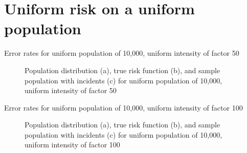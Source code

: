 

\section{Uniform risk on a uniform population}

\graphicspath{{./results/unif_50_unif/}}
\makeatletter
{}
\makeatother

\begin{table}[H]
    
    \caption[]{Error rates for uniform population of 10,000, uniform intensity of factor 50}
    \label{tbl:mean_error_rates:unif_50_unif}
\end{table}

\begin{figure}[H]
    
    \caption[]{Population distribution (a), true risk function (b), and sample population with incidents (c) for uniform population of 10,000, uniform intensity of factor 50}
    \label{fig:distributions:unif_50_unif}    
\end{figure}


\graphicspath{{./results/unif_100_unif/}}
\makeatletter
{}
\makeatother

\begin{table}[H]

\caption[]{Error rates for uniform population of 10,000, uniform intensity of factor 100}
\label{tbl:mean_error_rates:unif_100_unif}
\end{table}

\begin{figure}[H]
    
    \caption[]{Population distribution (a), true risk function (b), and sample population with incidents (c) for uniform population of 10,000, uniform intensity of factor 100}
    \label{fig:distributions:unif_100_unif}    
\end{figure}


\graphicspath{{./results/unif_200_unif/}}
\makeatletter
{}
\makeatother

